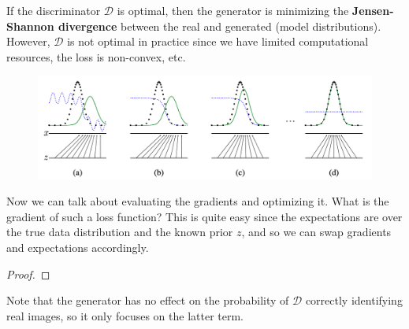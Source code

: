   If the discriminator $\mathcal{D}$ is optimal, then the generator is minimizing the \textbf{Jensen-Shannon divergence} between the real and generated (model distributions). However, $\mathcal{D}$ is not optimal in practice since we have limited computational resources, the loss is non-convex, etc. 

  \begin{figure}[H]
    \centering 
    \includegraphics[scale=0.3]{img/equil.png}
    \caption{} 
    \label{fig:nash_equilibrium}
  \end{figure}

  Now we can talk about evaluating the gradients and optimizing it. What is the gradient of such a loss function? This is quite easy since the expectations are over the true data distribution and the known prior $z$, and so we can swap gradients and expectations accordingly. 

  \begin{lemma}
    
  \end{lemma} 
  \begin{proof}
    
  \end{proof}

  Note that the generator has no effect on the probability of $\mathcal{D}$ correctly identifying real images, so it only focuses on the latter term. 


